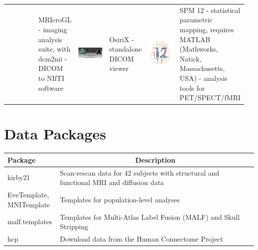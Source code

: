 \documentclass[final]{beamer}\usepackage[]{graphicx}\usepackage[]{color}
\begin{document}
\begin{frame}[fragile]
\begin{table}[!htb]
\begin{minipage}{0.40\linewidth}
\begin{tabular}{>{\centering}m{0.16\linewidth}>{\centering}m{0.16\linewidth}|>{\centering}m{0.16\linewidth}>{\centering}m{0.16\linewidth}|>{\centering}m{0.16\linewidth}>{\centering\arraybackslash}m{0.16\linewidth}}
& MRIcroGL - imaging analysis suite, with dcm2nii - DICOM to NIfTI software
& \includegraphics[clip, width=5cm, keepaspectratio]{figures/OsiriX.png}
& OsiriX - standalone DICOM viewer  
& \includegraphics[clip, width=5cm, keepaspectratio]{figures/spm12.png} & SPM 12 - statistical parametric mapping, requires MATLAB (Mathworks, Natick, Massachusetts, USA) - analysis tools for PET/SPECT/fMRI
\end{tabular}

\section{Data Packages}
\begin{table}[h]
\centering
\begin{tabular}{>{\centering }m{0.21\linewidth}m{0.79\linewidth}}
Package & \multicolumn{1}{c}{Description} \\ \hline
kirby21 & Scan-rescan data for 42 subjects with structural and functional MRI and diffusion data \citep{kirby} \\
EveTemplate, MNITemplate & Templates for population-level analyses \citep{eve, fonov2011unbiased, fonov2009unbiased}   \\
malf.templates & Templates \citep{bennett2012miccai} for Multi-Atlas Label Fusion (MALF) and Skull Stripping \\
hcp &  Download data from the Human Connectome Project	\citep{hcp}
\end{tabular}
\end{table}






\end{minipage}
\end{table}
\end{frame}
\end{document}
